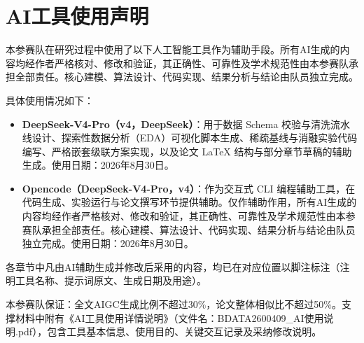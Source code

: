 \section*{AI工具使用声明}
\nocite{deepseek2026,lightgbm2017}

本参赛队在研究过程中使用了以下人工智能工具作为辅助手段。所有AI生成的内容均经作者严格核对、修改和验证，其正确性、可靠性及学术规范性由本参赛队承担全部责任。核心建模、算法设计、代码实现、结果分析与结论由队员独立完成。

具体使用情况如下：

\begin{itemize}[itemsep=4pt]
\item \textbf{DeepSeek-V4-Pro（v4，DeepSeek）}：用于数据 Schema 校验与清洗流水线设计、探索性数据分析（EDA）可视化脚本生成、稀疏基线与消融实验代码编写、严格嵌套级联方案实现，以及论文 LaTeX 结构与部分章节草稿的辅助生成。使用日期：2026年8月30日。

\item \textbf{Opencode（DeepSeek-V4-Pro，v4）}：作为交互式 CLI 编程辅助工具，在代码生成、实验运行与论文撰写环节提供辅助。仅作辅助作用，所有AI生成的内容均经作者严格核对、修改和验证，其正确性、可靠性及学术规范性由本参赛队承担全部责任。核心建模、算法设计、代码实现、结果分析与结论由队员独立完成。使用日期：2026年8月30日。
\end{itemize}

各章节中凡由AI辅助生成并修改后采用的内容，均已在对应位置以脚注标注（注明工具名称、提示词原文、生成日期及用途）。

本参赛队保证：全文AIGC生成比例不超过30\%，论文整体相似比不超过50\%。支撑材料中附有《AI工具使用详情说明》（文件名：BDATA2600409\_AI使用说明.pdf），包含工具基本信息、使用目的、关键交互记录及采纳修改说明。
